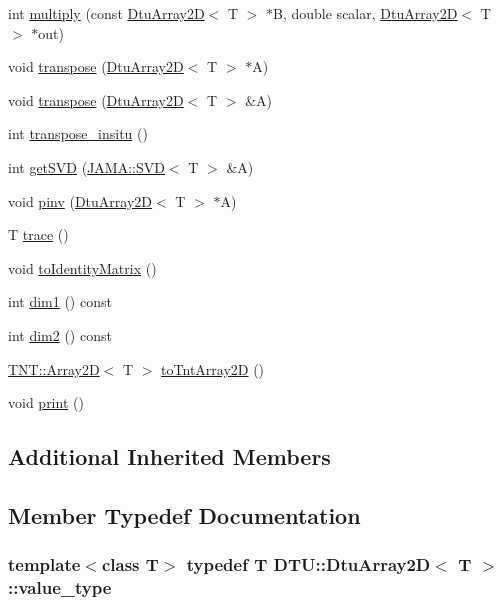 \begin{DoxyCompactItemize}
int \hyperlink{classDTU_1_1DtuArray2D_a1d0e65eb4b55f8f7821adf7888fc6b5a}{multiply} (const \hyperlink{classDTU_1_1DtuArray2D}{Dtu\-Array2\-D}$<$ T $>$ $\ast$B, double scalar, \hyperlink{classDTU_1_1DtuArray2D}{Dtu\-Array2\-D}$<$ T $>$ $\ast$out)
\item 
void \hyperlink{classDTU_1_1DtuArray2D_af581f022e7453af3da50685391f71f35}{transpose} (\hyperlink{classDTU_1_1DtuArray2D}{Dtu\-Array2\-D}$<$ T $>$ $\ast$A)
\item 
void \hyperlink{classDTU_1_1DtuArray2D_a076b2f5fced5f94eff5f21c51ad80961}{transpose} (\hyperlink{classDTU_1_1DtuArray2D}{Dtu\-Array2\-D}$<$ T $>$ \&A)
\item 
int \hyperlink{classDTU_1_1DtuArray2D_a95044424cf0a7805be6bcddb6b2683f2}{transpose\-\_\-insitu} ()
\item 
int \hyperlink{classDTU_1_1DtuArray2D_a817f8d8127c60c21481e42531389376c}{get\-S\-V\-D} (\hyperlink{classJAMA_1_1SVD}{J\-A\-M\-A\-::\-S\-V\-D}$<$ T $>$ \&A)
\item 
void \hyperlink{classDTU_1_1DtuArray2D_ac84d734c8563a5abd76a043fc3c3a0e6}{pinv} (\hyperlink{classDTU_1_1DtuArray2D}{Dtu\-Array2\-D}$<$ T $>$ $\ast$A)
\item 
T \hyperlink{classDTU_1_1DtuArray2D_a8a8b977b5acee1e45c175b188685779b}{trace} ()
\item 
void \hyperlink{classDTU_1_1DtuArray2D_aecc0518069f41f2e12e88b35933e3573}{to\-Identity\-Matrix} ()
\item 
int \hyperlink{classDTU_1_1DtuArray2D_a68ddbc5c53f0e19a2fc2bae855e36077}{dim1} () const 
\item 
int \hyperlink{classDTU_1_1DtuArray2D_aefec13b0e62c9b7f56b6109f47ea757e}{dim2} () const 
\item 
\hyperlink{classTNT_1_1Array2D}{T\-N\-T\-::\-Array2\-D}$<$ T $>$ \hyperlink{classDTU_1_1DtuArray2D_a906c78d88bdb45a4f9d8805d3a0c6262}{to\-Tnt\-Array2\-D} ()
\item 
void \hyperlink{classDTU_1_1DtuArray2D_a3d918f63f7cb85cdc05739ac4c79807c}{print} ()
\end{DoxyCompactItemize}
\subsection*{Additional Inherited Members}


\subsection{Member Typedef Documentation}
\hypertarget{classDTU_1_1DtuArray2D_afd205bf3e12c0c1a57d0a451fd45446d}{
\subsubsection[{value\-\_\-type}]{\setlength{\rightskip}{0pt plus 5cm}template$<$class T$>$ typedef T {\bf D\-T\-U\-::\-Dtu\-Array2\-D}$<$ T $>$\-::{\bf value\-\_\-type}}}\label{classDTU_1_1DtuArray2D_afd205bf3e12c0c1a57d0a451fd45446d}


